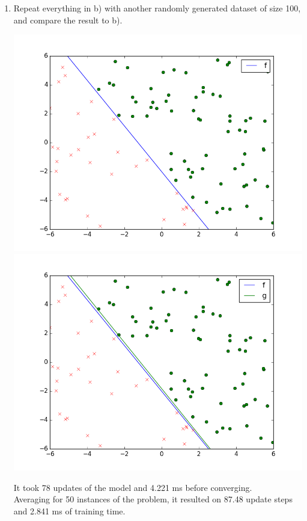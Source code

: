 \documentclass{article}
\begin{document}
\begin{enumerate}[label=(\alph*)]
\item Repeat everything in b) with another randomly generated dataset of size 100, and compare the result to b).
\begin{center}
\includegraphics[scale=0.35]{images/4_a.png} 
\includegraphics[scale=0.35]{images/4_b.png} 
\end{center}
It took 78 updates of the model and 4.221 ms before converging.\\
Averaging for 50 instances of the problem, it resulted on 87.48 update steps and 2.841 ms of training time.


\end{enumerate}
\end{document}
